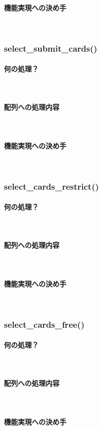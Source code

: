 \documentclass[11pt,a4paper, uplatex]{jsarticle}
\begin{document}
\paragraph{機能実現への決め手}\mbox{}\\
%
\subsubsection{select\_submit\_cards()}
\paragraph{何の処理？}\mbox{}\\
\paragraph{配列への処理内容}\mbox{}\\
\paragraph{機能実現への決め手}\mbox{}\\
%
\subsubsection{select\_cards\_restrict()}
\paragraph{何の処理？}\mbox{}\\
\paragraph{配列への処理内容}\mbox{}\\
\paragraph{機能実現への決め手}\mbox{}\\
%
\subsubsection{select\_cards\_free()}
\paragraph{何の処理？}\mbox{}\\
\paragraph{配列への処理内容}\mbox{}\\
\paragraph{機能実現への決め手}\mbox{}\\
\end{document}
